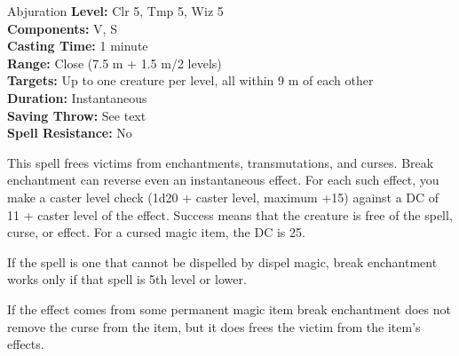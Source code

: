 {Abjuration}
{
	\textbf{Level:}
	Clr 5, Tmp 5, Wiz 5\\
	\textbf{Components:}
	V, S\\
	\textbf{Casting Time:}
	1 minute\\
	\textbf{Range:}
	Close (7.5 m + 1.5 m/2 levels)\\
	\textbf{Targets:}
	Up to one creature per level, all within 9 m of each other\\
	\textbf{Duration:}
	Instantaneous\\
	\textbf{Saving Throw:}
	See text\\
	\textbf{Spell Resistance:}
	No\\
}
{
	This spell frees victims from enchantments, transmutations, and curses. Break enchantment can reverse even an instantaneous effect. For each such effect, you make a caster level check (1d20 + caster level, maximum +15) against a DC of 11 + caster level of the effect. Success means that the creature is free of the spell, curse, or effect. For a cursed magic item, the DC is 25.

	If the spell is one that cannot be dispelled by dispel magic, break enchantment works only if that spell is 5th level or lower.

	If the effect comes from some permanent magic item break enchantment does not remove the curse from the item, but it does frees the victim from the item's effects.

}
